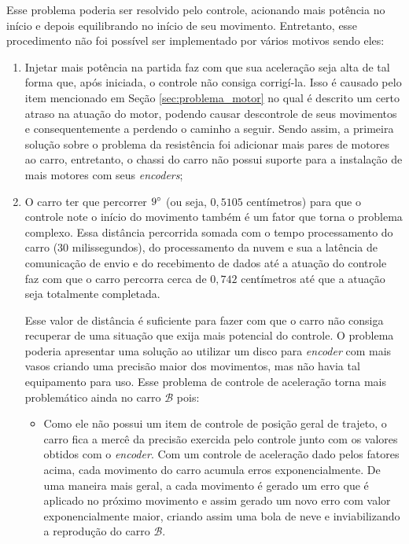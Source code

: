 			Esse problema poderia ser resolvido pelo controle, acionando mais potência no início e depois equilibrando no início de seu movimento. Entretanto, esse procedimento não foi possível ser implementado por vários motivos sendo eles:

			\begin{enumerate}
				\item Injetar mais potência na partida faz com que sua aceleração seja alta de tal forma que, após iniciada, o controle não consiga corrigí-la. Isso é causado pelo item mencionado em Seção \ref{sec:problema_motor} no qual é descrito um certo atraso na atuação do motor, podendo causar descontrole de seus movimentos e consequentemente a perdendo o caminho a seguir. Sendo assim, a primeira solução sobre o problema da resistência foi adicionar mais pares de motores ao carro, entretanto, o chassi do carro não possui suporte para a instalação de mais motores com seus \textit{encoders};

				\item O carro ter que percorrer $9\degree$ (ou seja, $0,5105$ centímetros) para que o controle note o início do movimento também é um fator que torna o problema complexo. 
				Essa distância percorrida somada com o tempo processamento do carro ($30$ milissegundos), do processamento da nuvem e sua a latência de comunicação de envio e do recebimento de dados até a atuação do controle faz com que o carro percorra cerca de $0,742$ centímetros até que a atuação seja totalmente completada. 
				
                Esse valor de distância é suficiente para fazer com que o carro não consiga recuperar de uma situação que exija mais potencial do controle. O problema poderia apresentar uma solução ao utilizar um disco para \textit{encoder} com mais vasos criando uma precisão maior dos movimentos, mas não havia tal equipamento para uso. Esse problema de controle de aceleração torna mais problemático ainda no carro $ \mathcal{B} $ pois:

				\begin{itemize}
					\item Como ele não possui um item de controle de posição geral de trajeto, o carro fica a mercê da precisão exercida pelo controle junto com os valores obtidos com o \textit{encoder}. Com um controle de aceleração dado pelos fatores acima, cada movimento do carro acumula erros exponencialmente. De uma maneira mais geral, a cada movimento é gerado um erro que é aplicado no próximo movimento e assim gerado um novo erro com valor exponencialmente maior, criando assim uma bola de neve e inviabilizando a reprodução do carro $ \mathcal{B} $.
				\end{itemize}
			\end{enumerate}


